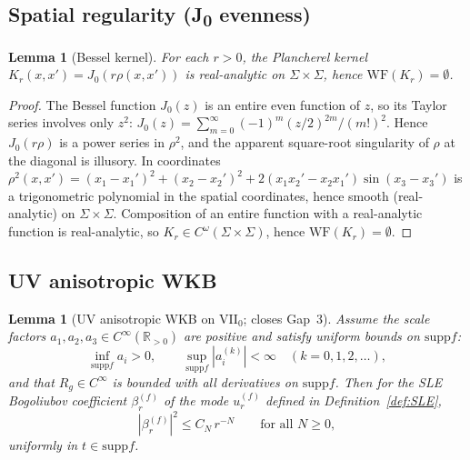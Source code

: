 \documentclass[12pt, a4paper]{article}
\newtheorem{lemma}[theorem]{Lemma}
\theoremstyle{remark}
\newcommand{\bR}{\mathbb{R}}
\newcommand{\WF}{\mathrm{WF}}
\newcommand{\supp}{\mathrm{supp}}
\begin{document}
\subsection{Spatial regularity (J\textsubscript{0} evenness)}

\begin{lemma}[Bessel kernel]\label{lem:bessel}
  For each $r > 0$, the Plancherel kernel $K_r(x,x') = J_0(r\rho(x,x'))$
  is real-analytic on $\Sigma \times \Sigma$, hence
  $\WF(K_r) = \emptyset$.
\end{lemma}

\begin{proof}
  The Bessel function $J_0(z)$ is an entire even function of $z$, so its
  Taylor series involves only $z^2$:
  $J_0(z) = \sum_{m=0}^\infty (-1)^m (z/2)^{2m}/(m!)^2$.
  Hence $J_0(r\rho)$ is a power series in $\rho^2$, and the apparent
  square-root singularity of $\rho$ at the diagonal is illusory.
  In coordinates $\rho^2(x,x') = (x_1-x_1')^2 + (x_2-x_2')^2 +
  2(x_1 x_2' - x_2 x_1')\sin(x_3-x_3')$ is a trigonometric polynomial in
  the spatial coordinates, hence smooth (real-analytic) on
  $\Sigma\times\Sigma$.  Composition of an entire function with a
  real-analytic function is real-analytic, so
  $K_r \in C^\omega(\Sigma\times\Sigma)$, hence $\WF(K_r) = \emptyset$.
\end{proof}

\subsection{UV anisotropic WKB}

\begin{lemma}[UV anisotropic WKB on VII$_0$; closes Gap~3]
  \label{lem:uvWKB}
  Assume the scale factors $a_1, a_2, a_3 \in C^\infty(\bR_{>0})$ are
  positive and satisfy uniform bounds on
  $\supp f$:
  \begin{equation}
    \inf_{\supp f} a_i > 0,
    \qquad
    \sup_{\supp f} |a_i^{(k)}| < \infty
    \quad (k = 0, 1, 2, \dots),
  \end{equation}
  and that $R_g \in C^\infty$ is bounded with all derivatives on
  $\supp f$.  Then for the SLE Bogoliubov coefficient
  $\beta_r^{(f)}$ of the mode $u_r^{(f)}$ defined in
  Definition~\ref{def:SLE},
  \begin{equation}\label{eq:beta-bound}
    |\beta_r^{(f)}|^2 \le C_N\,r^{-N}
    \qquad\text{for all } N \ge 0,
  \end{equation}
  uniformly in $t \in \supp f$.
\end{lemma}
\end{document}
